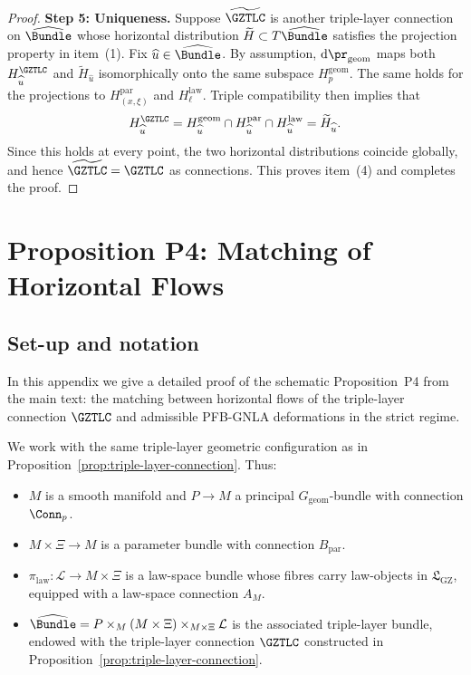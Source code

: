 \documentclass[11pt]{book}
\theoremstyle{plain}
\theoremstyle{definition}
\newcommand{\GZLS}{\ensuremath{\mathfrak{L}_{\mathrm{GZ}}}}       \newcommand{\GZLT}{\ensuremath{M_{!w}}}                           \newcommand{\GZLOC}{\ensuremath{A_M}}                             \newcommand{\GZLCurv}{\ensuremath{\mathcal{F}_{\mathrm{law}}}}
\begin{document}
\begin{proof}
\medskip\noindent
\textbf{Step 5: Uniqueness.}
Suppose \(\widetilde{\GZTLC}\) is another triple-layer connection on
\(\widehat{\Bundle}\) whose horizontal distribution
\(\widetilde{H}\subset T\widehat{\Bundle}\) satisfies the projection
property in item~(1).  Fix \(\widehat{u}\in\widehat{\Bundle}\).  By
assumption, \(\mathrm{d}\pr_{\mathrm{geom}}\) maps both
 \(H^{\GZTLC}_{\widehat{u}}\) and \(\widetilde{H}_{\widehat{u}}\)
isomorphically onto the same subspace \(H^{\mathrm{geom}}_p\).  The
same holds for the projections to \(H^{\mathrm{par}}_{(x,\xi)}\) and
 \(H^{\mathrm{law}}_{\ell}\).  Triple compatibility then implies that
\[
  H^{\GZTLC}_{\widehat{u}}
  =
  H_{\widehat{u}}^{\mathrm{geom}}
  \cap
  H_{\widehat{u}}^{\mathrm{par}}
  \cap
  H_{\widehat{u}}^{\mathrm{law}}
  =
  \widetilde{H}_{\widehat{u}}.
\]
Since this holds at every point, the two horizontal distributions
coincide globally, and hence \(\widetilde{\GZTLC}=\GZTLC\) as
connections.  This proves item~(4) and completes the proof.



\end{proof}



\section{Proposition P4: Matching of Horizontal Flows}
\label{app:I-P4}

\subsection*{Set-up and notation}


In this appendix we give a detailed proof of the schematic
Proposition~P4 from the main text: the matching between horizontal
flows of the triple-layer connection \(\GZTLC\) and admissible
PFB-GNLA deformations in the strict regime.

We work with the same triple-layer geometric configuration as in
Proposition~\ref{prop:triple-layer-connection}.  Thus:

\begin{itemize}
  \item \(M\) is a smooth manifold and \(P\to M\) a principal
        \(G_{\mathrm{geom}}\)-bundle with connection \(\Conn_p\).
  \item \(M\times\Xi\to M\) is a parameter bundle with connection
        \(B_{\mathrm{par}}\).
  \item \(\pi_{\mathrm{law}}:\mathcal{L}\to M\times\Xi\) is a
        law-space bundle whose fibres carry law-objects in \(\GZLS\),
        equipped with a law-space connection \(\GZLOC\).
  \item \(\widehat{\Bundle}=P\times_M(M\times\Xi)\times_{M\times\Xi}
        \mathcal{L}\) is the associated triple-layer bundle, endowed
        with the triple-layer connection \(\GZTLC\) constructed in
        Proposition~\ref{prop:triple-layer-connection}.
\end{itemize}
\end{document}

